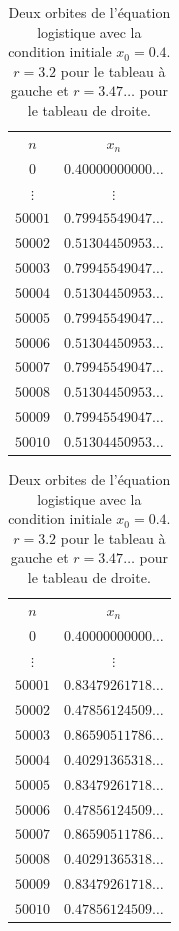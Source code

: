 {\begin{table}
{\scriptsize
\begin{center}
\begin{tabular}{c|c}
\cline{1-2}
  $n$   &  $x_n$  \\ 
\cline{1-2}
$0$ & $0.40000000000\ldots$ \\ 
$\vdots$ & $\vdots$ \\
$50001$ & $0.79945549047\ldots$ \\ 
$50002$ & $0.51304450953\ldots$ \\ 
$50003$ & $0.79945549047\ldots$ \\ 
$50004$ & $0.51304450953\ldots$ \\ 
$50005$ & $0.79945549047\ldots$ \\ 
$50006$ & $0.51304450953\ldots$ \\ 
$50007$ & $0.79945549047\ldots$ \\ 
$50008$ & $0.51304450953\ldots$ \\ 
$50009$ & $0.79945549047\ldots$ \\ 
$50010$ & $0.51304450953\ldots$ \\ 
\cline{1-2}
\end{tabular}
\qquad\qquad
\begin{tabular}{c|c}
\cline{1-2}
  $n$   &  $x_n$  \\ 
\cline{1-2}
$0$ & $0.40000000000\ldots$ \\ 
$\vdots$ & $\vdots$ \\
$50001$ & $0.83479261718\ldots$ \\ 
$50002$ & $0.47856124509\ldots$ \\ 
$50003$ & $0.86590511786\ldots$ \\ 
$50004$ & $0.40291365318\ldots$ \\ 
$50005$ & $0.83479261718\ldots$ \\ 
$50006$ & $0.47856124509\ldots$ \\ 
$50007$ & $0.86590511786\ldots$ \\ 
$50008$ & $0.40291365318\ldots$ \\ 
$50009$ & $0.83479261718\ldots$ \\
$50010$ & $0.47856124509\ldots$ \\ 
\cline{1-2}
\end{tabular}
\end{center}
}
\caption[Orbites de l'équation logistique $x_{n+1}=r x_n ( 1-x_n)$
pour $r=3.2$ et $r=3.47\ldots$]{Deux orbites de l'équation logistique
avec la condition initiale $x_0 = 0.4$.  $r=3.2$ pour le tableau à
gauche et $r=3.47\ldots$ pour le tableau de droite. \label{HS_LOGISTIC4}}
\end{table}

}
